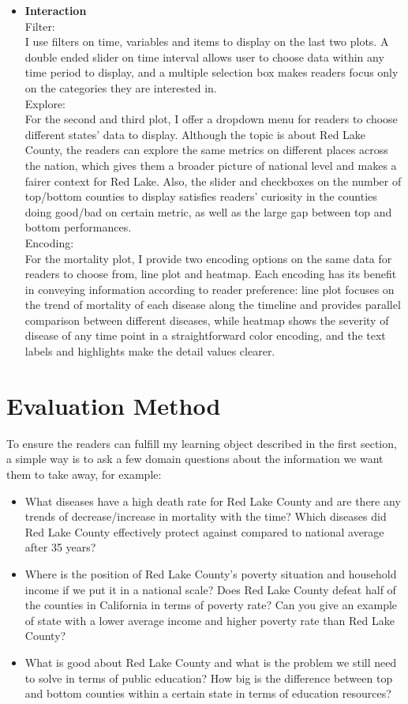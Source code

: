 \documentclass{article}
\begin{document}
\begin{itemize}
    \item \textbf{Interaction} \\
    Filter: \\
    I use filters on time, variables and items to display on the last two plots. A double ended slider on time interval allows user to choose data within any time period to display, and a multiple selection box makes readers focus only on the categories they are interested in. \\
    Explore: \\
    For the second and third plot, I offer a dropdown menu for readers to choose different states' data to display. Although the topic is about Red Lake County, the readers can explore the same metrics on different places across the nation, which gives them a broader picture of national level and makes a fairer context for Red Lake. Also, the slider and checkboxes on the number of top/bottom counties to display satisfies readers' curiosity in the counties doing good/bad on certain metric, as well as the large gap between top and bottom performances. \\
    Encoding: \\
    For the mortality plot, I provide two encoding options on the same data for readers to choose from, line plot and heatmap. Each encoding has its benefit in conveying information according to reader preference: line plot focuses on the trend of mortality of each disease along the timeline and provides parallel comparison between different diseases, while heatmap shows the severity of disease of any time point in a straightforward color encoding, and the text labels and highlights make the detail values clearer.
\end{itemize}

\newpage

\section{Evaluation Method}

To ensure the readers can fulfill my learning object described in the first section, a simple way is to ask a few domain questions about the information we want them to take away, for example:
\begin{itemize}
    \item What diseases have a high death rate for Red Lake County and are there any trends of decrease/increase in mortality with the time? Which diseases did Red Lake County effectively protect against compared to national average after 35 years?
    \item Where is the position of Red Lake County's poverty situation and household income if we put it in a national scale? Does Red Lake County defeat half of the counties in California in terms of poverty rate? Can you give an example of state with a lower average income and higher poverty rate than Red Lake County?
    \item What is good about Red Lake County and what is the problem we still need to solve in terms of public education? How big is the difference between top and bottom counties within a certain state in terms of education resources?
\end{itemize}
\end{document}
